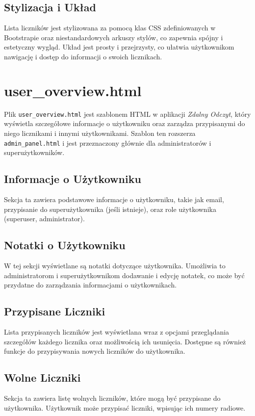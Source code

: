 \documentclass[12pt,a4paper]{report}
\begin{document}
\subsection{Stylizacja i Układ}
Lista liczników jest stylizowana za pomocą klas CSS zdefiniowanych w Bootstrapie oraz niestandardowych arkuszy stylów, co zapewnia spójny i estetyczny wygląd. Układ jest prosty i przejrzysty, co ułatwia użytkownikom nawigację i dostęp do informacji o swoich licznikach.

\section{user\_overview.html}
\label{sec:useroverview}
Plik \texttt{user\_overview.html} jest szablonem HTML w aplikacji \textit{Zdalny Odczyt}, który wyświetla szczegółowe informacje o użytkowniku oraz zarządza przypisanymi do niego licznikami i innymi użytkownikami. Szablon ten rozszerza \texttt{admin\_panel.html} i jest przeznaczony głównie dla administratorów i superużytkowników.

\subsection{Informacje o Użytkowniku}
Sekcja ta zawiera podstawowe informacje o użytkowniku, takie jak email, przypisanie do superużytkownika (jeśli istnieje), oraz role użytkownika (superuser, administrator).

\subsection{Notatki o Użytkowniku}
W tej sekcji wyświetlane są notatki dotyczące użytkownika. Umożliwia to administratorom i superużytkownikom dodawanie i edycję notatek, co może być przydatne do zarządzania informacjami o użytkownikach.

\subsection{Przypisane Liczniki}
Lista przypisanych liczników jest wyświetlana wraz z opcjami przeglądania szczegółów każdego licznika oraz możliwością ich usunięcia. Dostępne są również funkcje do przypisywania nowych liczników do użytkownika.

\subsection{Wolne Liczniki}
Sekcja ta zawiera listę wolnych liczników, które mogą być przypisane do użytkownika. Użytkownik może przypisać liczniki, wpisując ich numery radiowe.
\end{document}
